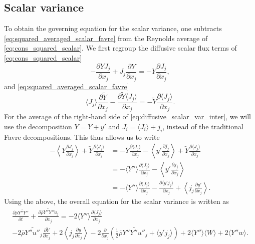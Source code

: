 \documentclass[oneside,a4paper,11pt]{report}
\newcommand{\rhoavg}{\overline{\rho}}
\newcommand{\yavg}{\overline{Y}}
\newcommand{\yfluc}{y'}
\newcommand{\uavgf}{\widetilde{u}}
\newcommand{\Yavgf}{\widetilde{Y}}
\newcommand{\Yflucf}{Y''}
\newcommand{\uflucf}{u''}
\begin{document}
\subsection{Scalar variance}
To obtain the governing equation for the scalar variance, one subtracts \cref{eq:squared_averaged_scalar_favre} from the Reynolds average of \cref{eq:cons_squared_scalar}. We first regroup the diffusive scalar flux terms of \cref{eq:cons_squared_scalar}
\begin{equation}
    \label{eq:diffusive_scalar_var_inter}
    -\frac{\partial Y J_j}{\partial x_j} + J_j \frac{\partial Y}{\partial x_j} = -Y \frac{\partial J_j}{\partial x_j},
\end{equation}
and \cref{eq:squared_averaged_scalar_favre}
\begin{equation}
    \langle J_j \rangle \frac{\partial \Yavgf}{\partial x_j} - \frac{\partial \Yavgf \langle J_j \rangle}{\partial x_j} = -\Yavgf \frac{\partial \langle J_j \rangle}{\partial x_j}.
\end{equation}
For the average of the right-hand side of \cref{eq:diffusive_scalar_var_inter}, we will use the decomposition $Y = \yavg + \yfluc$ and $J_i = \langle J_i \rangle + j_i$, instead of the traditional Favre decompositions. This thus allows us to write
\begin{align}
    -\left < Y \frac{\partial J_j}{\partial x_j} \right > + \Yavgf \frac{\partial \langle J_j \rangle}{\partial x_j} &= -\yavg \frac{\partial \langle J_j \rangle}{\partial x_j} - \left < \yfluc \frac{\partial j_j}{\partial x_j} \right > + \Yavgf \frac{\partial \langle J_j \rangle}{\partial x_j} \nonumber \\
    &= -\langle \Yflucf \rangle \frac{\partial \langle J_j \rangle}{\partial x_j} - \left < \yfluc \frac{\partial j_j}{\partial x_j} \right > \nonumber \\
    &= -\langle \Yflucf \rangle \frac{\partial \langle J_j \rangle}{\partial x_j} - \frac{\partial \langle \yfluc j_j \rangle}{\partial x_j} + \left < j_j \frac{\partial \yfluc}{\partial x_j} \right >.
\end{align}
Using the above, the overall equation for the scalar variance is written as
\begin{multline}
    \label{eq:scalar_variance_favre}
    \frac{\partial \rhoavg \widetilde{\Yflucf \Yflucf}}{\partial t} + \frac{\partial \rhoavg \widetilde{\Yflucf \Yflucf} \uavgf_j }{\partial x_j} = -2 \langle \Yflucf \rangle \frac{\partial \langle J_j \rangle }{\partial x_j} \\
    -2 \rhoavg \widetilde{\Yflucf \uflucf_j} \frac{\partial \Yavgf}{\partial x_j} + 2 \left < j_j \frac{\partial y}{\partial x_j} \right > - 2 \frac{\partial}{\partial x_j} \left ( \frac{1}{2} \rhoavg \widetilde{\Yflucf \Yflucf \uflucf_j} +  \langle \yfluc j_j \rangle \right) + 2 \langle \Yflucf \rangle \langle W \rangle + 2 \langle \Yflucf w \rangle.
\end{multline}
\end{document}
